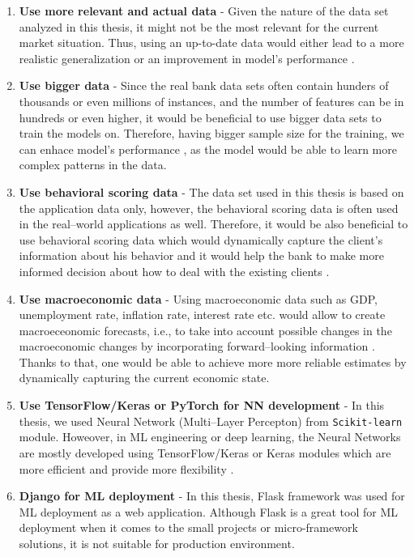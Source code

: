 \begin{enumerate}\setlength\itemsep{0em}
    \item \textbf{Use more relevant and actual data} - Given the nature of the data set analyzed in this thesis, it might not be the most relevant for the current market situation. Thus, using an up-to-date data would either lead to a more realistic generalization \citep {kumar2021blockchain} or an improvement in model's performance \citep{karatas2020increasing}.
    \item \textbf{Use bigger data} - Since the real bank data sets often contain hunders of thousands or even millions of instances, and the number of features can be in hundreds or even higher, it would be beneficial to use bigger data sets to train the models on. Therefore, having bigger sample size for the training, we can enhace model's performance \citep{ng2020influence}, as the model would be able to learn more complex patterns in the data. 
    \item \textbf{Use behavioral scoring data} - The data set used in this thesis is based on the application data only, however, the behavioral scoring data is often used in the real--world applications as well. Therefore, it would be also beneficial to use behavioral scoring data which would dynamically capture the client's information about his behavior and it would help the bank to make more informed decision about how to deal with the existing clients \citep{li2012overview}.
    \item \textbf{Use macroeconomic data} - Using macroeconomic data such as GDP, unemployment rate, inflation rate, interest rate etc. would allow to create macroeceonomic forecasts, i.e., to take into account possible changes in the macroeconomic changes by incorporating forward--looking information \citep{jakubik2007macroeconomic}.
    Thanks to that, one would be able to achieve more more reliable estimates by dynamically capturing the current economic state.
    \item \textbf{Use TensorFlow/Keras or PyTorch for NN development} - In this thesis, we used Neural Network (Multi--Layer Percepton) from \lstinline{Scikit-learn} module. Howeover, in ML engineering or deep learning, the Neural Networks are mostly developed using TensorFlow/Keras or Keras modules which are more efficient and provide more flexibility \citep{gevorkyan2019review}.
    \item \textbf{Django for ML deployment} - In this thesis, Flask framework was used for ML deployment as a web application. Although Flask is a great tool for ML deployment when it comes to the small projects or micro-framework solutions, it is not suitable for production environment.

\end{enumerate}
